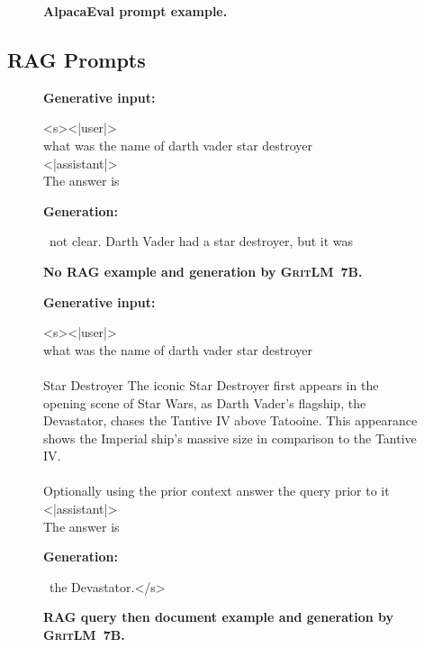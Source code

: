 \documentclass{article}
\newcommand{\modelbase}{\textsc{GritLM~7B}}
\begin{document}
\begin{figure}[htbp]
\hrulefill

\caption{\textbf{AlpacaEval prompt example.}}
\label{fig:alpacaeval}
\end{figure}

\FloatBarrier

\subsection{RAG Prompts}

\begin{figure}[htbp]
\hrulefill

\textbf{Generative input:}

\hrulefill

<s><|user|>\\
what was the name of darth vader star destroyer\\
<|assistant|>\\
The answer is

\hrulefill

\textbf{Generation:}

\hrulefill

~not clear. Darth Vader had a star destroyer, but it was

\hrulefill
\caption{\textbf{No RAG example and generation by \modelbase{}.}}
\label{fig:norag}
\end{figure}


\begin{figure}[htbp]
\hrulefill

\textbf{Generative input:}

\hrulefill

<s><|user|>\\
what was the name of darth vader star destroyer\\\\
Star Destroyer The iconic Star Destroyer first appears in the opening scene of Star Wars, as Darth Vader's flagship, the Devastator, chases the Tantive IV above Tatooine. This appearance shows the Imperial ship's massive size in comparison to the Tantive IV.\\\\
Optionally using the prior context answer the query prior to it\\
<|assistant|>\\
The answer is

\hrulefill

\textbf{Generation:}

\hrulefill

~the Devastator.</s>

\hrulefill
\caption{\textbf{RAG query then document example and generation by \modelbase{}.}}
\label{fig:rag1}
\end{figure}
\end{document}
